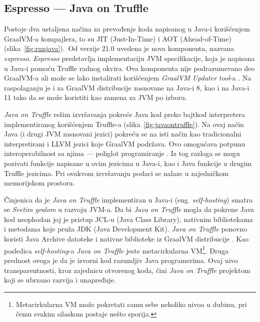\documentclass[a4paper]{article}
\begin{document}
\subsection{Espresso --- Java on Truffle}
\label{sub:espresso}

Postoje dva ustaljena načina za prevođenje koda napisanog u Java-i korišćenjem GraalVM-a kompajlera, to su JIT (Just-In-Time) i AOT (Ahead-of-Time) (slika~\ref{fig:runjava}).\ Od verzije 21.0 uvedena je nova komponenta, nazvana \emph{espresso}. \emph{Espresso} predstavlja implementaciju JVM specifikacije, koja je napisana u Java-i pomoću Truffle radnog okvira. Ova komponenta nije podrazumevano deo GraalVM-a ali može se lako instalirati korišćenjem \emph{GraalVM Updater tool}-a \cite{graalvm}. Na raspolaganju je i za GraalVM distribucije zasnovane na Java-i 8, kao i na Java-i 11 tako da se može koristiti kao zamena za JVM po izboru.

\emph{Java on Truffle} režim izvršavanja pokreće Java kod preko bajtkod interpretera implementiranog korišćenjem Truffle-a (slika~\ref{fig:javaontruffle}). Na ovaj način Java (i drugi JVM zasnovani jezici) pokreću se na isti način kao tradicionalni interpretirani i LLVM jezici koje GraalVM podržava. Ovo omogućava potpunu interoperabilnost sa njima --- poliglot programiranje \cite{grooteman2017java, graalvm}. Iz tog razloga se mogu pozivati funkcije napisane u ovim jezicima u Java-i, kao i Java funkcije u drugim Truffle jezicima. Pri ovakvom izvršavanju podaci se nalaze u zajedničkom memorijskom prostoru.

Činjenica da je \emph{Java on Truffle} implementiran u Java-i (eng. \emph{self-hosting}) smatra se \emph{Svetim gralom} u razvoju JVM-a. Da bi \emph{Java on Truffle} mogla da pokrene Java kod neophodan joj je pristup JCL-u (Java Class Library), nativnim bibliotekama i metodama koje pruža JDK (Java Development Kit). \emph{Java on Truffle} ponovno koristi Java Archive datoteke i nativne biblioteke iz GraalVM distribucije \cite{grooteman2017java}. Kao posledica \emph{self-hosting}-a \emph{Java on Truffle} jeste metacirkularna VM\footnote{Metacirkularna VM može pokretati samu sebe nekoliko nivoa u dubinu, pri čemu svakim silaskom postaje nešto sporija.}. Druga prednost ovoga je da je izvorni kod razumljiv Java programerima. Ovaj nivo transparentnosti, kroz zajednicu otvorenog koda, čini \emph{Java on Truffle} projektom koji se ubrzano razvija i unapređuje.
\end{document}
